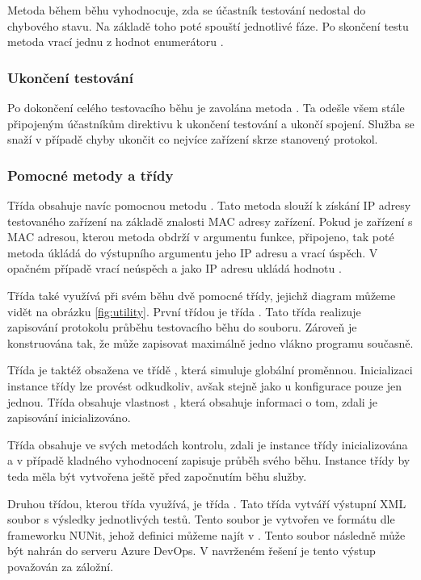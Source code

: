 Metoda během běhu vyhodnocuje, zda se účastník testování nedostal do chybového stavu. Na základě toho poté spouští jednotlivé fáze. Po skončení testu metoda vrací jednu z hodnot enumerátoru . 

\subsubsection{Ukončení testování}

Po dokončení celého testovacího běhu je zavolána metoda . Ta odešle všem stále připojeným účastníkům direktivu k ukončení testování a ukončí spojení. Služba se snaží v případě chyby ukončit co nejvíce zařízení skrze stanovený protokol.


\subsubsection{Pomocné metody a třídy}
Třída  obsahuje navíc pomocnou metodu . Tato metoda slouží k získání IP adresy testovaného zařízení na základě znalosti MAC adresy zařízení. Pokud je zařízení s MAC adresou, kterou metoda obdrží v argumentu funkce, připojeno, tak poté metoda úkládá do výstupního argumentu jeho IP adresu a vrací úspěch. V opačném případě vrací neúspěch a jako IP adresu ukládá hodnotu .

Třída také využívá při svém běhu dvě pomocné třídy, jejichž diagram můžeme vidět na obrázku \ref{fig:utility}. První třídou je třída . Tato třída realizuje zapisování protokolu průběhu testovacího běhu do souboru. Zároveň je konstruována tak, že může zapisovat maximálně jedno vlákno programu současně. 

Třída je taktéž obsažena ve třídě , která simuluje globální proměnnou. Inicializaci instance třídy  lze provést odkudkoliv, avšak stejně jako u konfigurace pouze jen jednou. Třída  obsahuje vlastnost , která obsahuje informaci o tom, zdali je zapisování inicializováno.  

Třída  obsahuje ve svých metodách kontrolu, zdali je instance třídy  inicializována a v případě kladného vyhodnocení zapisuje průběh svého běhu. Instance třídy  by teda měla být vytvořena ještě před započnutím běhu služby.

Druhou třídou, kterou třída  využívá, je třída . Tato třída vytváří výstupní XML soubor s výsledky jednotlivých testů.
Tento soubor je vytvořen ve formátu dle frameworku NUNit, jehož definici můžeme najít v \cite{nunit}. Tento soubor následně může být nahrán do serveru Azure DevOps. V navrženém řešení je tento výstup považován za záložní.


